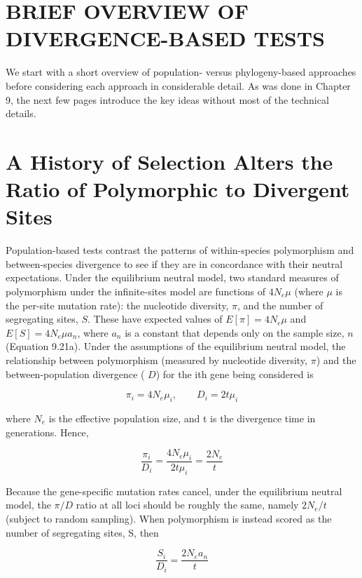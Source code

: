 \documentclass{article}
\begin{document}
\section{BRIEF OVERVIEW OF DIVERGENCE-BASED TESTS}
We start with a short overview of population- versus phylogeny-based approaches before considering each approach in considerable detail. As was done in Chapter 9, the next few pages introduce the key ideas without most of the technical details.

\section{A History of Selection Alters the Ratio of Polymorphic to Divergent Sites}
Population-based tests contrast the patterns of within-species polymorphism and between-species divergence to see if they are in concordance with their neutral expectations. Under the equilibrium neutral model, two standard measures of polymorphism under the infinite-sites model are functions of  $ 4N_e\mu $ (where  $ \mu $ is the per-site mutation rate): the nucleotide diversity,  $ \pi $, and the number of segregating sites,  $ S $. These have expected values of  $ E[\pi] = 4N_e\mu $ and  $ E[S] = 4N_e\mu a_n $, where  $ a_n $ is a constant that depends only on the sample size,  $ n $ (Equation 9.21a). Under the assumptions of the equilibrium neutral model, the relationship between polymorphism (measured by nucleotide diversity,  $ \pi $) and the between-population divergence ( $ D $) for the ith gene being considered is

\begin{equation}
\pi_{i}=4N_{e}\mu_{i},\qquad D_{i}=2t\mu_{i}
\tag{10.1a}
\label{eq:10_1a}
\end{equation}

where  $ N_{e} $ is the effective population size, and t is the divergence time in generations. Hence,

\begin{equation}
\frac{\pi_{i}}{D_{i}}=\frac{4N_{e}\mu_{i}}{2t\mu_{i}}=\frac{2N_{e}}{t}
\tag{10.1b}
\label{eq:10_1b}
\end{equation}

Because the gene-specific mutation rates cancel, under the equilibrium neutral model, the  $ \pi/D $ ratio at all loci should be roughly the same, namely  $ 2N_{e}/t $ (subject to random sampling). When polymorphism is instead scored as the number of segregating sites, S, then

\begin{equation}
\frac{S_{i}}{D_{i}}=\frac{2N_{e}a_{n}}{t}
\tag{10.1c}
\label{eq:10_1c}
\end{equation}
\end{document}
